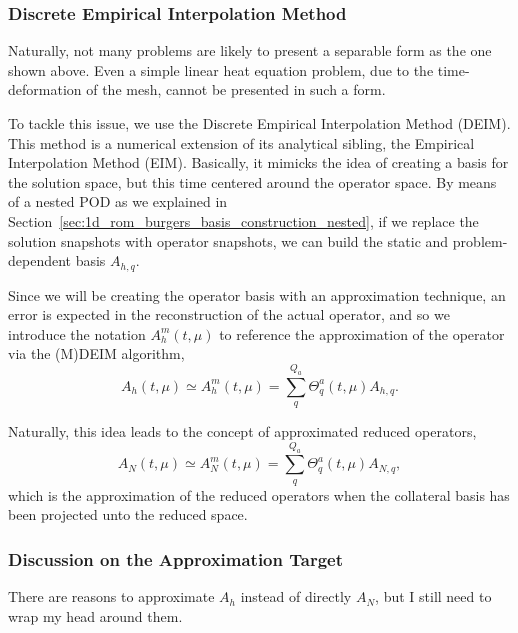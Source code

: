 \documentclass[../../thesis.tex]{subfiles}
\begin{document}
\subsubsection{Discrete Empirical Interpolation Method}
Naturally, not many problems are likely to present a separable form as the one shown above.
Even a simple linear heat equation problem, due to the time-deformation of the mesh, cannot be presented in such a form. 

To tackle this issue, we use the Discrete Empirical Interpolation Method (DEIM).
This method is a numerical extension of its analytical sibling, the Empirical Interpolation Method (EIM).
Basically, it mimicks the idea of creating a basis for the solution space, but this time centered around the operator space.
By means of a nested POD as we explained in Section~\ref{sec:1d_rom_burgers_basis_construction_nested}, 
if we replace the solution snapshots with operator snapshots, 
we can build the static and problem-dependent basis $A_{h,q}$.

Since we will be creating the operator basis with an approximation technique, 
an error is expected in the reconstruction of the actual operator, 
and so we introduce the notation $A_h^m(t, \mu)$ to reference the approximation of the operator via the (M)DEIM algorithm,
\begin{equation}
    \label{eq:1d_rom_burgers_system_approximation}
    A_h(t, \mu) \simeq A_h^m(t, \mu) = \sum_q^{Q_a} \Theta_q^a(t, \mu) A_{h,q}.
\end{equation}

Naturally, this idea leads to the concept of approximated reduced operators,
\begin{equation}
    A_N(t, \mu) \simeq A_N^m(t, \mu) = \sum_q^{Q_a} \Theta_q^a(t, \mu) A_{N,q},
\end{equation}
which is the approximation of the reduced operators when the collateral basis 
has been projected unto the reduced space.

\subsubsection{Discussion on the Approximation Target}
There are reasons to approximate $A_h$ instead of directly $A_N$, but I still need to wrap my head around them. 

\end{document}
